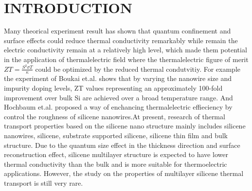 \documentclass[%
 reprint,
 amsmath,amssymb,
 aps,
 prb,
]{revtex4-1}
\begin{document}
\section{INTRODUCTION}

Many theorical experiment result has shown that quantum confinement and surface effects could reduce thermal conductivity remarkably while remain the electric conductivity remain at a relatively high level, which made them potential in the application of thermalelectric field where the thermalelectric figure of merit $ZT=\frac{S^2 \sigma T}{\kappa}$ could be optimized by the reduced thermal condutvitiy. For example
the experiment of Boukai et.al.\cite{Boukai2008} shows that by varying the nanowire size and impurity doping levels, ZT values representing an approximately 100-fold improvement over bulk Si are achieved over a broad temperature range. And Hochbaum et.al.\cite{Hochbaum2008} proposed a way of enchancing thermalelectric effieciency by control the roughness of silicene nanowires.At present, research of thermal transport properties based on the silicene nano structure mainly includes silicene nanowires\cite{Hochbaum2008,Yang2010,Shi2009,Boukai2008}, silicene\cite{Pei2013,Ng2013,Xie2014,Zhang2014,Liu2014}, substrate supported silicene\cite{Wang2015,Zhang2015a}, silicene thin film and bulk structure\cite{Bodapati2006,Tang2013Thermal,Jeong2012Thermal,Liu2006Thermal,Wang2006Lattice}. Due to the quantum size effect in the thickness direction and surface reconstruction effect, silicene multilayer structure is expected to have lower thermal conductivity than the bulk and is more suitable for thermoelectric applications. However, the study on the properties of multilayer silicene thermal transport is still very rare.
\end{document}
